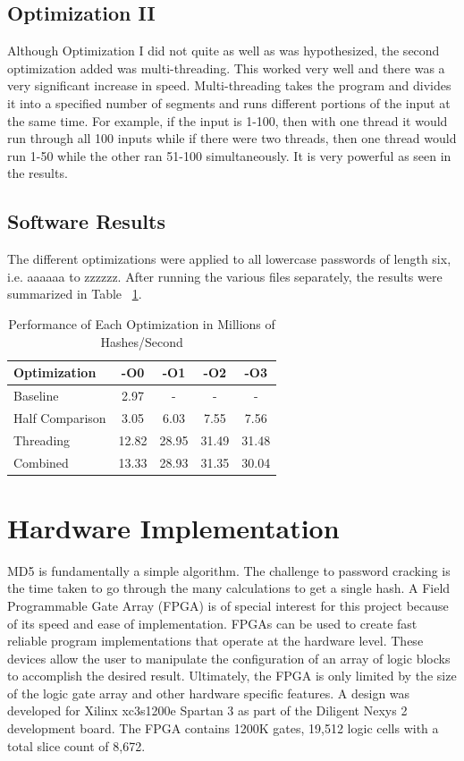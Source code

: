 \documentclass[journal]{IEEEtran}
\begin{document}
\subsection{Optimization II}
Although Optimization I did not quite as well as was hypothesized, the second optimization added was multi-threading. This worked very well and there was a very significant increase in speed. Multi-threading takes the program and divides it into a specified number of segments and runs different portions of the input at the same time. For example, if the input is 1-100, then with one thread it would run through all 100 inputs while if there were two threads, then one thread would run 1-50 while the other ran 51-100 simultaneously. It is very powerful as seen in the results.

\subsection{Software Results}
The different optimizations were applied to all lowercase passwords of length six, i.e. aaaaaa to zzzzzz. After running the various files separately, the results were summarized in Table ~\ref{hashes}.

\begin{table}[H]
	\centering
	\caption{Performance of Each Optimization in Millions of Hashes/Second}
	\label{hashes}
	\begin{tabular}{@{}lcccc@{}}
		\toprule
		\textbf{Optimization} & \textbf{-O0} & \textbf{-O1} & \textbf{-O2} & \textbf{-O3} \\ \midrule
		Baseline              & 2.97         & -            & -            & -            \\
		Half Comparison       & 3.05         & 6.03         & 7.55         & 7.56         \\
		Threading             & 12.82        & 28.95        & 31.49        & 31.48        \\
		Combined              & 13.33        & 28.93        & 31.35        & 30.04        \\ \bottomrule
	\end{tabular}
\end{table}

\section{Hardware Implementation}
MD5 is fundamentally a simple algorithm. The challenge to password cracking is the time taken to go through the many calculations to get a single hash. A Field Programmable Gate Array (FPGA) is of special interest for this project because of its speed and ease of implementation. FPGAs can be used to create fast reliable program implementations that operate at the hardware level. These devices allow the user to manipulate the configuration of an array of logic blocks to accomplish the desired result. Ultimately, the FPGA is only limited by the size of the logic gate array and other hardware specific features. A design was developed for Xilinx xc3s1200e Spartan 3 as part of the Diligent Nexys 2 development board. The FPGA contains 1200K gates, 19,512 logic cells with a total slice count of 8,672.
\end{document}
